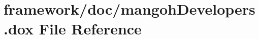 \hypertarget{mangoh_developers_8dox}{}\section{framework/doc/mangoh\+Developers.dox File Reference}
\label{mangoh_developers_8dox}
